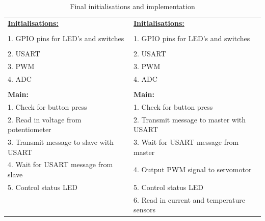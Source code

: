\begin{table}[H]
\centering
    \begin{tabular}{|l|l|}
    \hline
            \textbf{\underline{Initialisations:}}&\textbf{\underline{Initialisations:}}\\
            &\\
            1. GPIO pins for LED's and switches & 1. GPIO pins for LED's and switches\\
            &\\
            2. USART             & 2. USART\\
            3. PWM               & 3. PWM\\
            4. ADC               & 4. ADC\\
            &\\
            \textbf{Main:}                             &  \textbf{Main:}\\
            1. Check for button press                  & 1. Check for button press\\
            2. Read in voltage from potentiometer      & 2. Transmit message to master with USART\\
            3. Transmit message to slave with USART    & 3. Wait for USART message from master\\
            4. Wait for USART message from slave       & 4. Output PWM signal to servomotor\\
            5. Control status LED                      & 5. Control status LED \\
                                                       & 6. Read in current and temperature sensors \\
                                  \hline
    \end{tabular}\
    \vspace{-2mm}
    \caption{Final initialisations and implementation}
\end{table}

